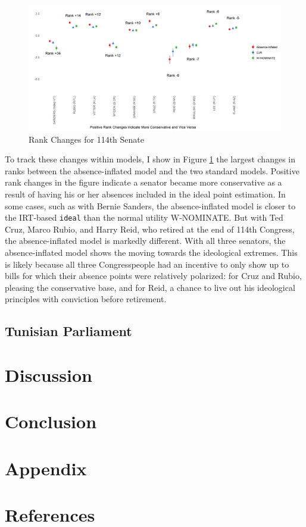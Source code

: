 	\begin{figure}
		\centering
		\caption{Rank Changes for 114th Senate}\label{rank_sen}
		\includegraphics[width=0.8\linewidth]{big_diff}
	\end{figure}
	
	To track these changes within models, I show in Figure \ref{rank_sen} the largest changes in ranks between the absence-inflated model and the two standard models. Positive rank changes in the figure indicate a senator became more conservative as a result of having his or her absences included in the ideal point estimation. In some cases, such as with Bernie Sanders, the absence-inflated model is closer to the IRT-based \texttt{ideal} than the normal utility W-NOMINATE. But with Ted Cruz, Marco Rubio, and Harry Reid, who retired at the end of 114th Congress, the absence-inflated model is markedly different. With all three senators, the absence-inflated model shows the moving towards the ideological extremes. This is likely because all three Congresspeople had an incentive to only show up to bills for which their absence points were relatively polarized: for Cruz and Rubio, pleasing the conservative base, and for Reid, a chance to live out his ideological principles with conviction before retirement.
	
	\subsection*{Tunisian Parliament}
	
	\section*{Discussion}
	
	\section*{Conclusion}
	
	\section*{Appendix}
	
	\section*{References}
	
	
	
